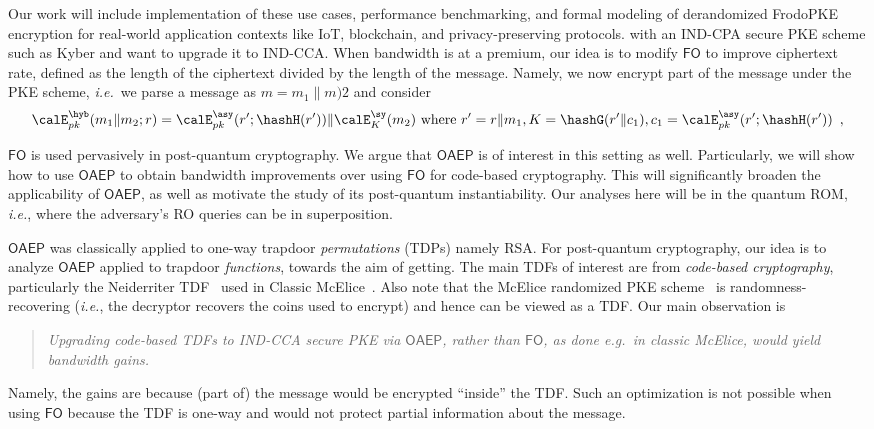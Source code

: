 {\begin{itemize}
Our work will include implementation of these use cases, performance benchmarking, and formal modeling of derandomized FrodoPKE encryption for real-world application contexts like IoT, blockchain, and privacy-preserving protocols.
with an IND-CPA secure PKE scheme such as Kyber and want to upgrade it to IND-CCA. When bandwidth is at a premium, our idea is to modify $\mathsf{FO}$ to improve ciphertext rate, defined as the length of the ciphertext divided by the length of the message. Namely, we now encrypt part of the message under the PKE scheme, \emph{i.e.}~we  parse a message as $m = m_1 \| m)2$ and consider 
\[
\calE^{\hyb}_{pk}(m_1 \| m_2;r) = 
\calE^{\asy}_{pk}(r'; \hashH(r')) \| \calE^{\sy}_{K}(m_2)~\mbox{where}~r' = r \| m_1, K = \hashG(r' \| c_1), c_1 = \calE^{\asy}_{pk}(r'; \hashH(r'))
\enspace,
\]
\fi
\fi

$\mathsf{FO}$ is used pervasively in post-quantum cryptography. We argue that $\mathsf{OAEP}$ is of interest in this setting  as well. Particularly, we will show how to use $\mathsf{OAEP}$ to obtain bandwidth improvements over using  $\mathsf{FO}$ for code-based cryptography.  This will significantly broaden the applicability of $\mathsf{OAEP}$, as well as motivate the study of its post-quantum instantiability. Our analyses here will be in the quantum ROM, \emph{i.e.}, where the adversary's RO queries can be in superposition.

 $\mathsf{OAEP}$ was classically applied to one-way trapdoor \emph{permutations} (TDPs) namely RSA. For post-quantum cryptography, our idea is to analyze $\mathsf{OAEP}$ applied to trapdoor \emph{functions}, towards the aim of getting. The main TDFs of interest are from \emph{code-based cryptography}, particularly the Neiderriter TDF~\cite{} used in Classic McElice~\cite{}. Also note that  the  McElice randomized PKE scheme~\cite{} is  randomness-recovering (\emph{i.e.}, the decryptor recovers the  coins used to encrypt) and  hence can be viewed as a TDF. 
 Our main observation is 
 \begin{quote}
\emph{Upgrading code-based TDFs to IND-CCA secure PKE via $\mathsf{OAEP}$, rather than $\mathsf{FO}$, as  done \emph{e.g.}~in classic McElice, would yield bandwidth gains.}
\end{quote}
Namely, the gains are because (part of) the message would be encrypted ``inside'' the TDF.
Such an optimization is not possible when using $\mathsf{FO}$ because the TDF  is one-way and would not protect partial information about the message.


\end{itemize}}
